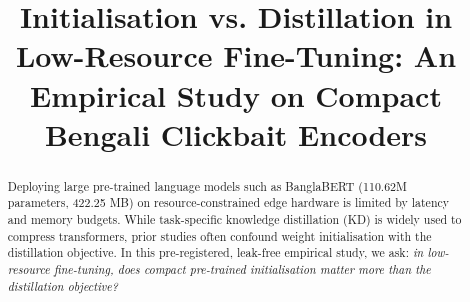 \documentclass[conference]{IEEEtran}
\begin{document}
\title{Initialisation vs. Distillation in Low-Resource Fine-Tuning: An Empirical Study on Compact Bengali Clickbait Encoders}

\author{
}

\maketitle

\begin{abstract}
Deploying large pre-trained language models such as BanglaBERT (110.62M parameters, 422.25 MB) on resource-constrained edge hardware is limited by latency and memory budgets. While task-specific knowledge distillation (KD) is widely used to compress transformers, prior studies often confound weight initialisation with the distillation objective. In this pre-registered, leak-free empirical study, we ask: \textit{in low-resource fine-tuning, does compact pre-trained initialisation matter more than the distillation objective?}


\end{abstract}
\end{document}
